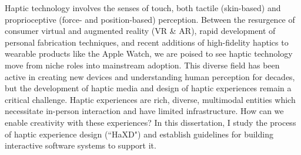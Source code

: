 Haptic technology involves the senses of touch, both tactile (skin-based) and proprioceptive (force- and position-based) perception.
Between the resurgence of consumer virtual and augmented reality (VR \& AR), rapid development of personal fabrication techniques, and recent additions of high-fidelity haptics to wearable products like the Apple Watch, we are poised to see haptic technology move from niche roles into mainstream adoption.
This diverse field has been active in creating new devices and understanding human perception for decades, but the development of haptic media and design of haptic experiences remain a critical challenge.
Haptic experiences are rich, diverse, multimodal entities which necessitate in-person interaction and have limited infrastructure.
How can we enable creativity with these experiences?
In this dissertation, I study the process of haptic experience design (``HaXD") and establish guidelines for building interactive software systems to support it.
%
%
%
